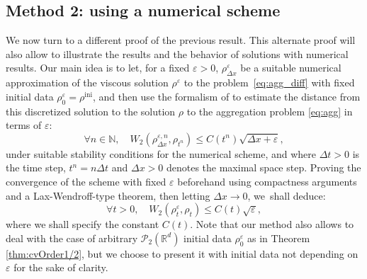\documentclass[JEP,XML,SOM,Unicode, NoFloatCountersInSection,published]{cedram}
\newcommand{\ini}{\mathrm{ini}}
\def\NN{\mathbb{N}}
\def\RR{\mathbb{R}}
\def\eps{\varepsilon}
\def\dt{\Delta t}
\def\dx{\Delta x}
\def\calP{{\mathcal P}}
\theoremstyle{plain}
\theoremstyle{definition}
\begin{document}
\subsection{Method 2: using a numerical scheme}\label{section:lambdaConvex:2}

We now turn to a different proof of the previous result. This alternate proof will also allow to illustrate the results and the behavior of solutions with numerical results. Our main idea is to let, for a fixed $\eps>0$, $\rho_{\dx}^\eps$ be a suitable numerical approximation of the viscous solution $\rho^\eps$ to the problem~\eqref{eq:agg_diff} with fixed initial data $\rho_0^\eps = \rho^{\ini}$, and then use the formalism of \cite{dlv20} to estimate the distance from this discretized solution to the solution $\rho$ to the aggregation problem \eqref{eq:agg} in terms of $\eps$:
\[
\forall n \in \NN, \quad W_2(\rho_{\dx}^{\eps,n}, \rho_{t^n}) \leq C(t^n) \sqrt{\dx + \eps},
\]
under suitable stability conditions for the numerical scheme, and where $\dt>0$ is the time step, $t^n = n\dt$ and $\dx>0$ denotes the maximal space step. Proving the convergence of the scheme with fixed $\eps$ beforehand using compactness arguments and a Lax-Wendroff-type theorem, then letting $\dx \to 0$, we~shall deduce:
\[
\forall t>0, \quad W_2(\rho_t^\eps, \rho_t) \leq C(t) \sqrt{\eps},
\]
where we shall specify the constant $C(t)$. Note that our method also allows to deal with the case of arbitrary $\calP_2(\RR^d)$ initial data $\rho_0^\eps$ as in Theorem \ref{thm:cvOrder1/2}, but we choose to present it with initial data not depending on $\eps$ for the sake of clarity.
\end{document}
